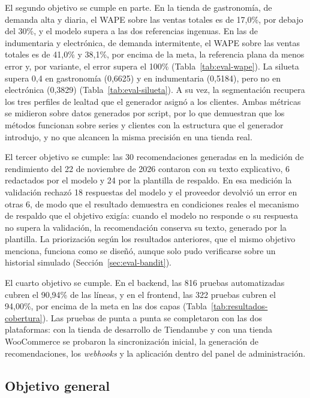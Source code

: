 El segundo objetivo se cumple en parte. En la tienda de gastronomía, de demanda alta y diaria, el WAPE sobre las ventas totales es de 17,0\%, por debajo del 30\%, y el modelo supera a las dos referencias ingenuas. En las de indumentaria y electrónica, de demanda intermitente, el WAPE sobre las ventas totales es de 41,0\% y 38,1\%, por encima de la meta, la referencia plana da menos error y, por variante, el error supera el 100\% (Tabla~\ref{tab:eval-wape}). La silueta supera 0,4 en gastronomía (0,6625) y en indumentaria (0,5184), pero no en electrónica (0,3829) (Tabla~\ref{tab:eval-silueta}). A su vez, la segmentación recupera los tres perfiles de lealtad que el generador asignó a los clientes. Ambas métricas se midieron sobre datos generados por script, por lo que demuestran que los métodos funcionan sobre series y clientes con la estructura que el generador introdujo, y no que alcancen la misma precisión en una tienda real.

El tercer objetivo se cumple: las 30 recomendaciones generadas en la medición de rendimiento del 22 de noviembre de 2026 contaron con su texto explicativo, 6 redactados por el modelo y 24 por la plantilla de respaldo. En esa medición la validación rechazó 18 respuestas del modelo y el proveedor devolvió un error en otras 6, de modo que el resultado demuestra en condiciones reales el mecanismo de respaldo que el objetivo exigía: cuando el modelo no responde o su respuesta no supera la validación, la recomendación conserva su texto, generado por la plantilla. La priorización según los resultados anteriores, que el mismo objetivo menciona, funciona como se diseñó, aunque solo pudo verificarse sobre un historial simulado (Sección~\ref{sec:eval-bandit}).

El cuarto objetivo se cumple. En el backend, las 816 pruebas automatizadas cubren el 90,94\% de las líneas, y en el frontend, las 322 pruebas cubren el 94,00\%, por encima de la meta en las dos capas (Tabla~\ref{tab:resultados-cobertura}). Las pruebas de punta a punta se completaron con las dos plataformas: con la tienda de desarrollo de Tiendanube y con una tienda WooCommerce se probaron la sincronización inicial, la generación de recomendaciones, los \emph{webhooks} y la aplicación dentro del panel de administración.

\subsection{Objetivo general}
\label{sec:conclusiones-general}

